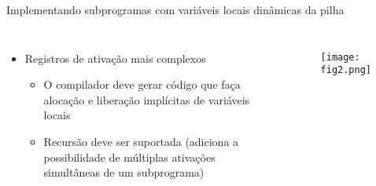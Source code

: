 \documentclass[10pt]{beamer}
\begin{document}
\begin{frame}{Implementando subprogramas com variáveis locais dinâmicas da pilha}
\begin{columns}[T,onlytextwidth]
	\begin{itemize}
	\item Registros de ativação mais complexos
	\begin{itemize}
		\item O compilador deve gerar código que faça alocação e liberação implícitas de variáveis locais
		\item Recursão deve ser suportada (adiciona a possibilidade de múltiplas ativações simultâneas de um subprograma)
	\end{itemize}
\end{itemize}
  \begin{figure}
  \texttt{[image: fig2.png]}
\end{figure}
\end{columns}
\end{frame}
\end{document}
